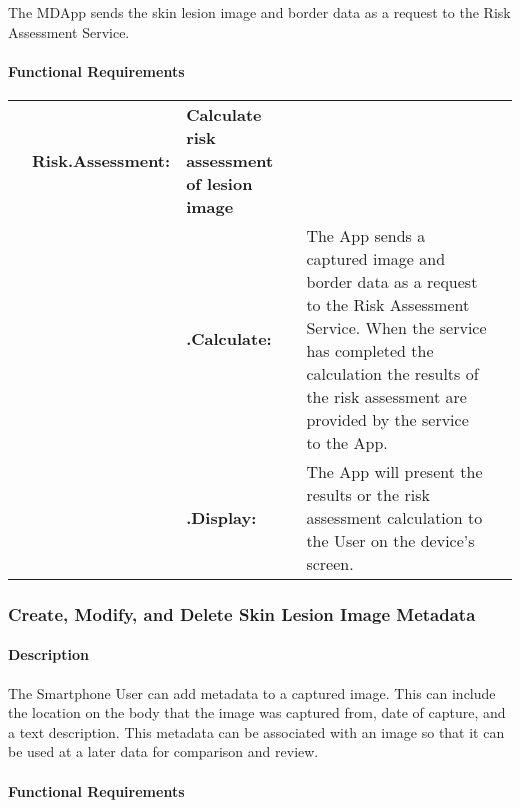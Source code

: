 {            The MDApp sends the skin lesion image and border data as a request to the Risk Assessment Service.

            \paragraph{Functional Requirements}
                \begin{longtable}[H]{ >{\bfseries}l >{\bfseries}l >{\bfseries}l p{9.5cm} l }

                    \hline
                    & \multicolumn{2}{>{\bfseries}l}
                    {Risk.Assessment:} & \textbf{Calculate risk assessment of lesion image}  \\

                    & & .Calculate: &
                    The App sends a captured image and border data as a request to the Risk Assessment Service. When the service has completed the calculation the results of the risk assessment are provided by the service to the App.
                    \\

                    & & .Display: &
                    The App will present the results or the risk assessment calculation to the User on the device’s screen.
                    \\
                    \hline
                \end{longtable}


        \subsubsection{Create, Modify, and Delete Skin Lesion Image Metadata}

            \paragraph{Description}

            The Smartphone User can add metadata to a captured image. This can include the location on the body that the image was captured from, date of capture, and a text description. This metadata can be associated with an image so that it can be used at a later data for comparison and review.

            \paragraph{Functional Requirements}
                \begin{longtable}[H]{ >{\bfseries}l >{\bfseries}l >{\bfseries}l p{9.5cm} l }


\end{longtable}}
